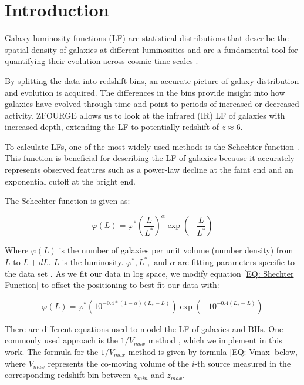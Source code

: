 \section{Introduction}

Galaxy luminosity functions (LF) are statistical distributions that describe the spatial density of galaxies at different luminosities and are a fundamental tool for quantifying their evolution across cosmic time scales \citep{han_evolution_2012, dai_mid-infrared_2009, wylezalek_galaxy_2014}.

By splitting the data into redshift bins, an accurate picture of galaxy distribution and evolution is acquired. The differences in the bins provide insight into how galaxies have evolved through time and point to periods of increased or decreased activity. ZFOURGE allows us to look at the infrared (IR) LF of galaxies with increased depth, extending the LF to potentially redshift of $z \approx 6$.

To calculate LFs, one of the most widely used methods is the Schechter function \citep{schechter_analytic_1976}. This function is beneficial for describing the LF of galaxies because it accurately represents observed features such as a power-law decline at the faint end and an exponential cutoff at the bright end. 

The Schechter function is given as:

\begin{equation} 
    \varphi(L) = \varphi^* \left(\frac{L}{L^*}\right)^\alpha \exp\left(-\frac{L}{L^*}\right) 
    \label{EQ: Shechter Function}
\end{equation}

Where $\varphi(L)$ is the number of galaxies per unit volume (number density) from $L$ to $L+dL$. $L$ is the luminosity. $\varphi^*, L^*,$ and $\alpha$ are fitting parameters specific to the data set \citep{schechter_analytic_1976}. As we fit our data in log space, we modify equation \ref{EQ: Shechter Function} to offset the positioning to best fit our data with:

\begin{equation} 
    \varphi(L) = \varphi^* \left(10^{-0.4*(1-\alpha)(L_{*}-L)}\right) \exp\left(-10^{-0.4(L_{*}-L)}\right)
    \label{EQ: Shechter Function}
\end{equation}

There are different equations used to model the LF of galaxies and BHs. One commonly used approach is the $1/V_{max}$ method \citep{schmidt_space_1968, enia_new_2022}, which we implement in this work. The formula for the $1/V_{max}$ method is given by formula \ref{EQ: Vmax} below, where $V_{max}$ represents the co-moving volume of the $i$-th source measured in the corresponding redshift bin between $z_{min}$ and $z_{max}$.

